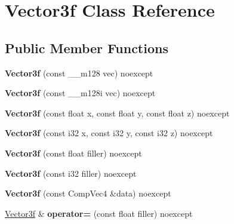 \hypertarget{class_vector3f}{}\section{Vector3f Class Reference}
\label{class_vector3f}
\subsection*{Public Member Functions}
\begin{DoxyCompactItemize}
\item 
\mbox{\label{class_vector3f_a4e8abfa18d76f6c3191a4db038f9ec31}} 
{\bfseries Vector3f} (const \+\_\+\+\_\+m128 vec) noexcept
\item 
\mbox{\label{class_vector3f_ac4ea096310c4950d9857c70c2924507d}} 
{\bfseries Vector3f} (const \+\_\+\+\_\+m128i vec) noexcept
\item 
\mbox{\label{class_vector3f_af43fca5b619035fa41be55aed8c58661}} 
{\bfseries Vector3f} (const float x, const float y, const float z) noexcept
\item 
\mbox{\label{class_vector3f_ae959ab0a36b30b77761ba9d014942509}} 
{\bfseries Vector3f} (const i32 x, const i32 y, const i32 z) noexcept
\item 
\mbox{\label{class_vector3f_a5a6b53892d0a23acf77a8f0cff92b558}} 
{\bfseries Vector3f} (const float filler) noexcept
\item 
\mbox{\label{class_vector3f_a2b00c2d99d90c9d6284c95c4f2c50d51}} 
{\bfseries Vector3f} (const i32 filler) noexcept
\item 
\mbox{\label{class_vector3f_abfed8c262b9cecefb387a5cf9fd8f288}} 
{\bfseries Vector3f} (const Comp\+Vec4 \&data) noexcept
\item 
\mbox{\label{class_vector3f_ab727e3f9844af287191e09618abd43ab}} 
\mbox{\hyperlink{class_vector3f}{Vector3f}} \& {\bfseries operator=} (const float filler) noexcept
\item 
\mbox{\label{class_vector3f_a89526604dd962785343702f6e2cde315}} 

\end{DoxyCompactItemize}
